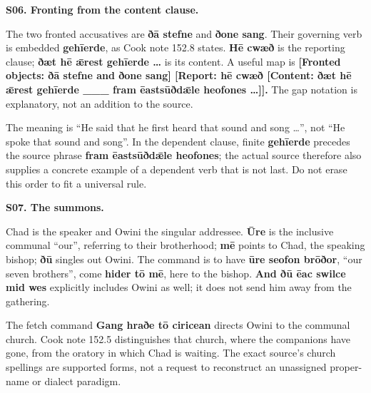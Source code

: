 \par\begin{minipage}{\linewidth}\raggedright
\textbf{S06. Fronting from the content clause.}

The two fronted accusatives are \textbf{ðā stefne} and \textbf{ðone sang}. Their governing verb is embedded \textbf{gehīerde}, as Cook note 152.8 states. \textbf{Hē cwæð} is the reporting clause; \textbf{ðæt hē ǣrest gehīerde …} is its content. A useful map is \textbf{[Fronted objects: ðā stefne and ðone sang] [Report: hē cwæð [Content: ðæt hē ǣrest gehīerde \_\_\_ fram ēastsūðdǣle heofones …]].} The gap notation is explanatory, not an addition to the source.

The meaning is “He said that he first heard that sound and song …”, not “He spoke that sound and song”. In the dependent clause, finite \textbf{gehīerde} precedes the source phrase \textbf{fram ēastsūðdǣle heofones}; the actual source therefore also supplies a concrete example of a dependent verb that is not last. Do not erase this order to fit a universal rule.

\end{minipage}\par\addvspace{4pt}

\par\begin{minipage}{\linewidth}\raggedright
\textbf{S07. The summons.}

Chad is the speaker and Owini the singular addressee. \textbf{Ūre} is the inclusive communal “our”, referring to their brotherhood; \textbf{mē} points to Chad, the speaking bishop; \textbf{ðū} singles out Owini. The command is to have \textbf{ūre seofon brōðor}, “our seven brothers”, come \textbf{hider tō mē}, here to the bishop. \textbf{And ðū ēac swilce mid wes} explicitly includes Owini as well; it does not send him away from the gathering.

The fetch command \textbf{Gang hraðe tō ciricean} directs Owini to the communal church. Cook note 152.5 distinguishes that church, where the companions have gone, from the oratory in which Chad is waiting. The exact source’s church spellings are supported forms, not a request to reconstruct an unassigned proper-name or dialect paradigm.

\end{minipage}\par\addvspace{4pt}

